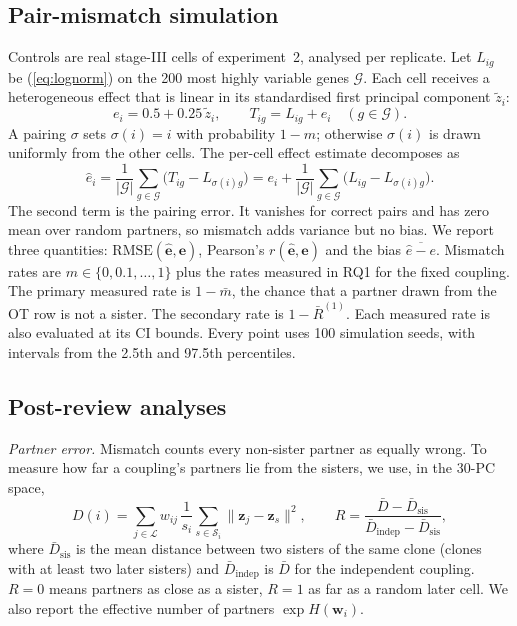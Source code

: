 \documentclass[10pt,journal,compsoc]{IEEEtran}
\begin{document}
\subsection{Pair-mismatch simulation }\label{sec:m_rq4}
Controls are real stage-III cells of experiment~2, analysed per replicate. Let $L_{ig}$ be
(\ref{eq:lognorm}) on the 200 most highly variable genes $\mathcal{G}$. Each cell receives a
heterogeneous effect that is linear in its standardised first principal component
$\tilde{z}_i$:
\begin{equation}
e_i=0.5+0.25\,\tilde{z}_i,\qquad T_{ig}=L_{ig}+e_i\quad(g\in\mathcal{G}).
\end{equation}
A pairing $\sigma$ sets $\sigma(i)=i$ with probability $1-m$; otherwise $\sigma(i)$ is drawn
uniformly from the other cells. The per-cell effect estimate decomposes as
\begin{equation}
\hat{e}_i=\frac{1}{|\mathcal{G}|}\sum_{g\in\mathcal{G}}\bigl(T_{ig}-L_{\sigma(i)g}\bigr)
=e_i+\frac{1}{|\mathcal{G}|}\sum_{g\in\mathcal{G}}\bigl(L_{ig}-L_{\sigma(i)g}\bigr).
\label{eq:rq4}
\end{equation}
The second term is the pairing error. It vanishes for correct pairs and has zero mean over
random partners, so mismatch adds variance but no bias. We report three quantities:
$\mathrm{RMSE}(\hat{\mathbf{e}},\mathbf{e})$, Pearson's $r(\hat{\mathbf{e}},\mathbf{e})$ and
the bias $\overline{\hat{e}-e}$. Mismatch rates are $m\in\{0,0.1,\dots,1\}$ plus the rates
measured in RQ1 for the fixed coupling. The primary measured rate is $1-\bar{m}$, the chance
that a partner drawn from the OT row is not a sister. The secondary rate is $1-\bar{R}^{(1)}$.
Each measured rate is also evaluated at its CI bounds. Every point uses 100 simulation seeds,
with intervals from the 2.5th and 97.5th percentiles.

\subsection{Post-review analyses}\label{sec:m_post}
\emph{Partner error.} Mismatch counts every non-sister partner as equally wrong. To measure
how far a coupling's partners lie from the sisters, we use, in the 30-PC space,
\begin{equation}
D(i)=\sum_{j\in\mathcal{L}}w_{ij}\,\frac{1}{s_i}\sum_{s\in\mathcal{S}_i}\|\mathbf{z}_j-\mathbf{z}_s\|^2,\qquad
R=\frac{\bar D-\bar D_{\mathrm{sis}}}{\bar D_{\mathrm{indep}}-\bar D_{\mathrm{sis}}},
\label{eq:pe}
\end{equation}
where $\bar D_{\mathrm{sis}}$ is the mean distance between two sisters of the same clone
(clones with at least two later sisters) and $\bar D_{\mathrm{indep}}$ is $\bar D$ for the
independent coupling. $R=0$ means partners as close as a sister, $R=1$ as far as a random
later cell. We also report the effective number of partners $\exp H(\mathbf{w}_i)$.
\end{document}
